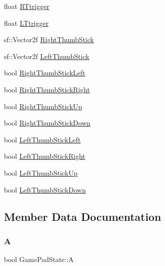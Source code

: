 \begin{DoxyCompactItemize}
\item 
float \mbox{\hyperlink{struct_game_pad_state_a732f21527576a79e1048c07d860c776f}{R\+Ttrigger}}
\item 
float \mbox{\hyperlink{struct_game_pad_state_ac2e8ae5edd8fa9aabdf7e80dc7ab27eb}{L\+Ttrigger}}
\item 
sf\+::\+Vector2f \mbox{\hyperlink{struct_game_pad_state_aa61c5ce692ac24a1321732430e59f157}{Right\+Thumb\+Stick}}
\item 
sf\+::\+Vector2f \mbox{\hyperlink{struct_game_pad_state_ac3a0edb2c529f440314594316e9d1b0f}{Left\+Thumb\+Stick}}
\item 
bool \mbox{\hyperlink{struct_game_pad_state_a02154aee012af997c8ade5b830c9bb74}{Right\+Thumb\+Stick\+Left}}
\item 
bool \mbox{\hyperlink{struct_game_pad_state_aae0320804b00eb6afcadc1e90c98af21}{Right\+Thumb\+Stick\+Right}}
\item 
bool \mbox{\hyperlink{struct_game_pad_state_a2a24e65c49537c41bd67ef99e3612948}{Right\+Thumb\+Stick\+Up}}
\item 
bool \mbox{\hyperlink{struct_game_pad_state_a30da80b20ae3e5ca2fe496606be2809b}{Right\+Thumb\+Stick\+Down}}
\item 
bool \mbox{\hyperlink{struct_game_pad_state_a6fcf75972e366da8e0edea1740ffb3ac}{Left\+Thumb\+Stick\+Left}}
\item 
bool \mbox{\hyperlink{struct_game_pad_state_a6c14d937da017846c084513d5b0bf20b}{Left\+Thumb\+Stick\+Right}}
\item 
bool \mbox{\hyperlink{struct_game_pad_state_ac4a033dea20ba81b7c0ef15f41fdf396}{Left\+Thumb\+Stick\+Up}}
\item 
bool \mbox{\hyperlink{struct_game_pad_state_ab15f64c8a5dfc1c06d6a23f5ff4d894a}{Left\+Thumb\+Stick\+Down}}
\end{DoxyCompactItemize}


\subsection{Member Data Documentation}
\mbox{\label{struct_game_pad_state_af86728754942546c867166ee93b5d928}} 
\subsubsection{\texorpdfstring{A}{A}}
{\footnotesize\ttfamily bool Game\+Pad\+State\+::A}

